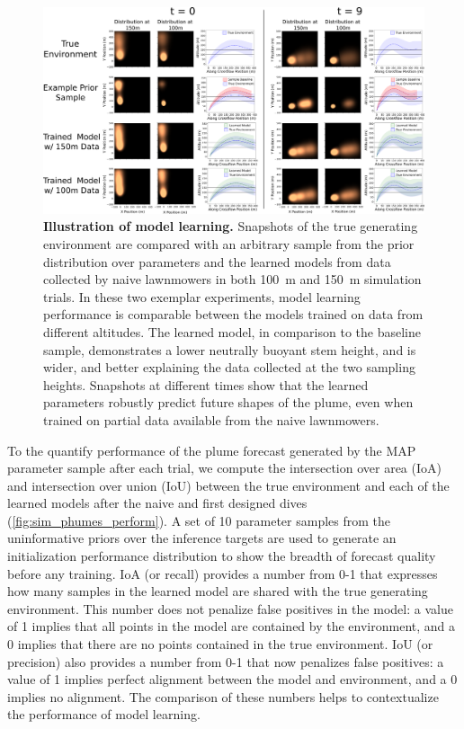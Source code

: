 \begin{figure}[h!]
    \centering
    \includegraphics[width=\columnwidth]{figures/sim_mod.png}
    \caption[Illustration of model learning]{\textbf{Illustration of model learning.} Snapshots of the true generating environment are compared with an arbitrary sample from the prior distribution over \PHUMES parameters and the learned models from data collected by naive lawnmowers in both \SI{100}{\meter} and \SI{150}{\meter} simulation trials. In these two exemplar experiments, model learning performance is comparable between the \PHUMES models trained on data from different altitudes. The learned model, in comparison to the baseline sample, demonstrates a lower neutrally buoyant stem height, and is wider, and better explaining the data collected at the two sampling heights. Snapshots at different times show that the learned parameters robustly predict future shapes of the plume, even when trained on partial data available from the naive lawnmowers.}
    \label{fig:sim_model}
\end{figure}

To the quantify performance of the plume forecast generated by the MAP parameter sample after each trial, we compute the intersection over area (IoA) and intersection over union (IoU) between the true environment and each of the learned models after the naive and first \PHORTEX designed dives (\cref{fig:sim_phumes_perform}). A set of 10 parameter samples from the uninformative priors over the inference targets are used to generate an initialization performance distribution to show the breadth of forecast quality before any training. IoA (or recall) provides a number from 0-1 that expresses how many samples in the learned model are shared with the true generating environment. This number does not penalize false positives in the model: a value of 1 implies that all points in the model are contained by the environment, and a 0 implies that there are no points contained in the true environment. IoU (or precision) also provides a number from 0-1 that now penalizes false positives: a value of 1 implies perfect alignment between the model and environment, and a 0 implies no alignment. The comparison of these numbers helps to contextualize the performance of model learning. 

